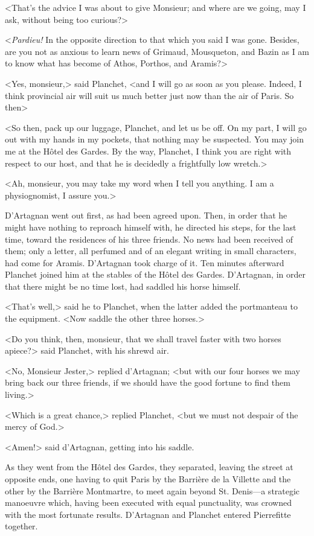 <That's the advice I was about to give Monsieur; and where are we going, may I ask, without being too curious?> 

<\textit{Pardieu!} In the opposite direction to that which you said I was gone. Besides, are you not as anxious to learn news of Grimaud, Mousqueton, and Bazin as I am to know what has become of Athos, Porthos, and Aramis?> 

<Yes, monsieur,> said Planchet, <and I will go as soon as you please. Indeed, I think provincial air will suit us much better just now than the air of Paris. So then\longdash> 

<So then, pack up our luggage, Planchet, and let us be off. On my part, I will go out with my hands in my pockets, that nothing may be suspected. You may join me at the Hôtel des Gardes. By the way, Planchet, I think you are right with respect to our host, and that he is decidedly a frightfully low wretch.> 

<Ah, monsieur, you may take my word when I tell you anything. I am a physiognomist, I assure you.> 

D'Artagnan went out first, as had been agreed upon. Then, in order that he might have nothing to reproach himself with, he directed his steps, for the last time, toward the residences of his three friends. No news had been received of them; only a letter, all perfumed and of an elegant writing in small characters, had come for Aramis. D'Artagnan took charge of it. Ten minutes afterward Planchet joined him at the stables of the Hôtel des Gardes. D'Artagnan, in order that there might be no time lost, had saddled his horse himself. 

<That's well,> said he to Planchet, when the latter added the portmanteau to the equipment. <Now saddle the other three horses.> 

<Do you think, then, monsieur, that we shall travel faster with two horses apiece?> said Planchet, with his shrewd air. 

<No, Monsieur Jester,> replied d'Artagnan; <but with our four horses we may bring back our three friends, if we should have the good fortune to find them living.> 

<Which is a great chance,> replied Planchet, <but we must not despair of the mercy of God.> 

<Amen!> said d'Artagnan, getting into his saddle. 

As they went from the Hôtel des Gardes, they separated, leaving the street at opposite ends, one having to quit Paris by the Barrière de la Villette and the other by the Barrière Montmartre, to meet again beyond St. Denis---a strategic manoeuvre which, having been executed with equal punctuality, was crowned with the most fortunate results. D'Artagnan and Planchet entered Pierrefitte together. 


